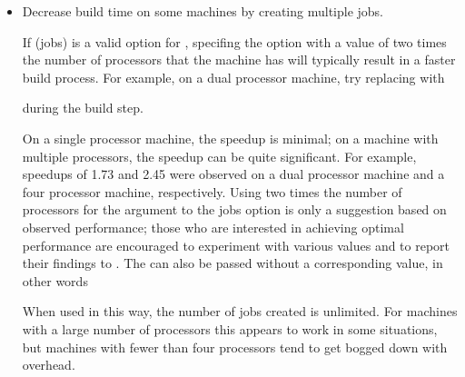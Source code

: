 \begin{itemize}
\item Decrease build time on some machines by creating multiple jobs.

If  (jobs) is a valid option for ,
specifing the  option with a value of two times the number 
of processors that the machine has will typically result in a faster build 
process.  For example, on a dual processor machine, try replacing 
 with 


during the build step.

On a single processor machine, the speedup is minimal; on a machine with 
multiple processors, the speedup can be quite significant.  For example, 
speedups of 1.73 and 2.45 were observed on a dual processor machine and a four 
processor machine, respectively.  Using two times the number of processors for 
the argument to the jobs option is only a suggestion based on observed 
performance; those who are interested in achieving optimal performance are
encouraged to experiment with various values and to report 
their findings to .  The 
 can also be passed without a corresponding value, in other 
words


When used in this way, the number of jobs created is unlimited.  For machines 
with a large number of processors this appears to work in some situations, but
machines with fewer than four processors tend to get bogged down with 
overhead.

\end{itemize}

